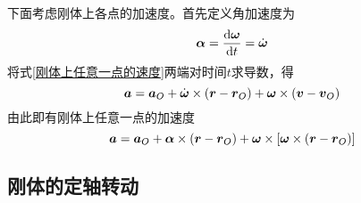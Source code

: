 下面考虑刚体上各点的加速度。首先定义{\heiti 角加速度}为
\begin{equation}
	\boldsymbol{\alpha} = \frac{\mathrm{d} \boldsymbol{\omega}}{\mathrm{d} t} = \dot{\boldsymbol{\omega}}
\end{equation}
将式\eqref{刚体上任意一点的速度}两端对时间$t$求导数，得
\begin{equation*}
	\boldsymbol{a} = \boldsymbol{a}_O + \dot{\boldsymbol{\omega}} \times (\boldsymbol{r}-\boldsymbol{r}_O) + \boldsymbol{\omega} \times (\boldsymbol{v}-\boldsymbol{v}_O)
\end{equation*}
由此即有刚体上任意一点的加速度
\begin{equation}
	\boldsymbol{a} = \boldsymbol{a}_O + \boldsymbol{\alpha} \times (\boldsymbol{r}-\boldsymbol{r}_O) + \boldsymbol{\omega} \times \left[\boldsymbol{\omega} \times (\boldsymbol{r}-\boldsymbol{r}_O)\right]
	\label{刚体上任意一点的加速度}
\end{equation}

\subsection{刚体的定轴转动}


